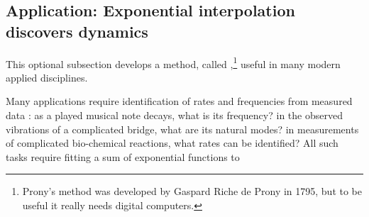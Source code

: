 










\subsection{Application: Exponential interpolation discovers dynamics}
\label{sec:eidd}



This optional subsection develops a method, called ,\footnote{Prony's method was developed by Gaspard Riche de Prony in 1795, but to be useful it really needs digital computers.} useful in many modern applied disciplines.   

Many applications require identification of rates and frequencies from measured data \cite[e.g.,][]{Pereyra2010}:
as a played musical note decays, what is its frequency?
in the observed vibrations of a complicated bridge, what are its natural modes?
in measurements of complicated bio-chemical reactions, what rates can be identified?
All such tasks require fitting a sum of exponential functions to 



